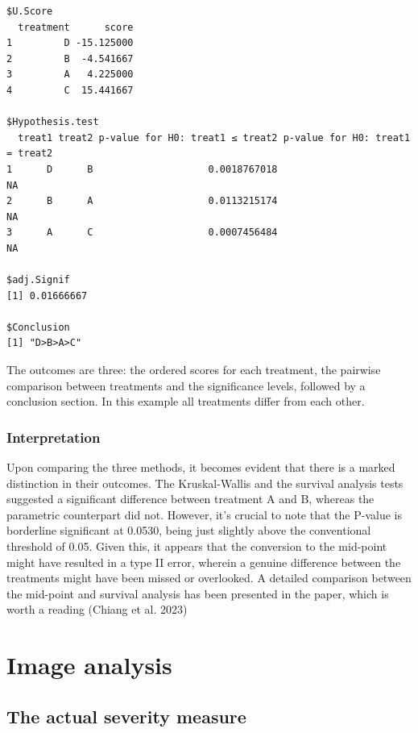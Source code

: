 \documentclass[
  letterpaper,
]{book}
\begin{document}
\begin{verbatim}
$U.Score
  treatment      score
1         D -15.125000
2         B  -4.541667
3         A   4.225000
4         C  15.441667

$Hypothesis.test
  treat1 treat2 p-value for H0: treat1 ≤ treat2 p-value for H0: treat1 = treat2
1      D      B                    0.0018767018                              NA
2      B      A                    0.0113215174                              NA
3      A      C                    0.0007456484                              NA

$adj.Signif
[1] 0.01666667

$Conclusion
[1] "D>B>A>C"
\end{verbatim}

The outcomes are three: the ordered scores for each treatment, the
pairwise comparison between treatments and the significance levels,
followed by a conclusion section. In this example all treatments differ
from each other.

\hypertarget{interpretation}{%
\subsection{Interpretation}\label{interpretation}}

Upon comparing the three methods, it becomes evident that there is a
marked distinction in their outcomes. The Kruskal-Wallis and the
survival analysis tests suggested a significant difference between
treatment A and B, whereas the parametric counterpart did not. However,
it's crucial to note that the P-value is borderline significant at
0.0530, being just slightly above the conventional threshold of 0.05.
Given this, it appears that the conversion to the mid-point might have
resulted in a type II error, wherein a genuine difference between the
treatments might have been missed or overlooked. A detailed comparison
between the mid-point and survival analysis has been presented in the
paper, which is worth a reading (Chiang et al. 2023)

\hypertarget{image-analysis}{%
\chapter{Image analysis}\label{image-analysis}}

\hypertarget{the-actual-severity-measure}{%
\section{The actual severity
measure}\label{the-actual-severity-measure}}
\end{document}
